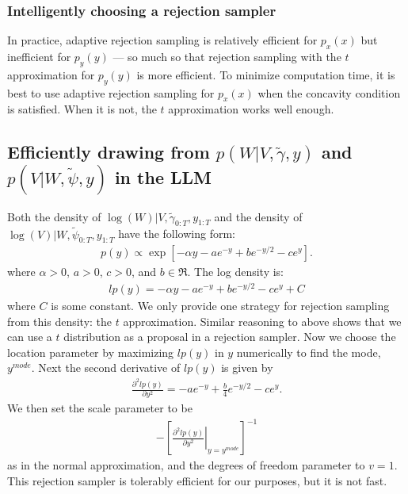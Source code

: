 \documentclass{article}
\begin{document}
\subsubsection{Intelligently choosing a rejection sampler}
In practice, adaptive rejection sampling is relatively efficient for $p_x(x)$ but inefficient for $p_y(y)$ --- so much so that rejection sampling with the $t$ approximation for $p_y(y)$ is more efficient. To minimize computation time, it is best to use adaptive rejection sampling for $p_x(x)$ when the concavity condition is satisfied. When it is not, the $t$ approximation works well enough.

\subsection{Efficiently drawing from $p(W|V,\tilde{\gamma},y)$ and $p(V|W,\tilde{\psi},y)$ in the LLM}

Both the density of $\log(W)|V,\tilde{\gamma}_{0:T},y_{1:T}$ and the density of $\log(V)|W,\tilde{\psi}_{0:T},y_{1:T}$ have the following form:
\begin{align*}
  p(y)\propto \exp\left[-\alpha y - ae^{-y} + be^{-y/2} - ce^y\right].
\end{align*}
where $\alpha>0$, $a>0$, $c>0$, and $b\in \Re$. The log density is:
\begin{align*}
  lp(y) = -\alpha y - ae^{-y} + be^{-y/2} - ce^y + C
\end{align*}
where $C$ is some constant. We only provide one strategy for rejection sampling from this density: the $t$ approximation. Similar reasoning to above shows that we can use a $t$ distribution as a proposal in a rejection sampler. Now we choose the location parameter by maximizing $lp(y)$ in $y$ numerically to find the mode, $y^{mode}$. Next the second derivative of $lp(y)$ is given by
\begin{align*}
  \frac{\partial^2 lp(y)}{\partial y^2} = -ae^{-y} + \frac{b}{4}e^{-y/2}-ce^y.
\end{align*}
We then set the scale parameter to be
\begin{align*}
  -\left[\left.\frac{\partial^2 lp(y)}{\partial y^2}\right|_{y=y^{mode}}\right]^{-1}
\end{align*}
as in the normal approximation, and the degrees of freedom parameter to $v=1$. This rejection sampler is tolerably efficient for our purposes, but it is not fast.




\clearpage



\end{document}

